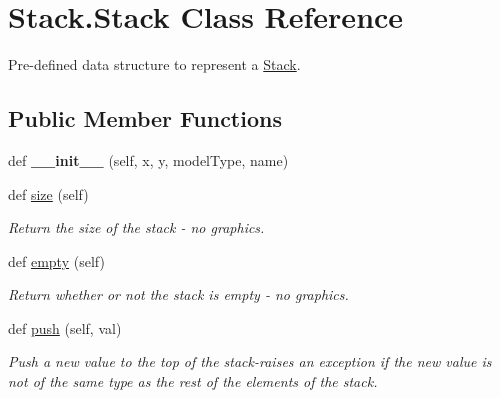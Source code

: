 \hypertarget{class_stack_1_1_stack}{}\section{Stack.\+Stack Class Reference}
\label{class_stack_1_1_stack}


Pre-\/defined data structure to represent a \hyperlink{class_stack_1_1_stack}{Stack}.  


\subsection*{Public Member Functions}
\begin{DoxyCompactItemize}
\item 
\mbox{\label{class_stack_1_1_stack_a7f70c39c7407c4939620daec869a821f}} 
def {\bfseries \+\_\+\+\_\+init\+\_\+\+\_\+} (self, x, y, model\+Type, name)
\item 
\mbox{\label{class_stack_1_1_stack_ad9471af89d6d83d7bc042b75bd6c1995}} 
def \hyperlink{class_stack_1_1_stack_ad9471af89d6d83d7bc042b75bd6c1995}{size} (self)
\begin{DoxyCompactList}\small\item\em Return the size of the stack -\/ no graphics. \end{DoxyCompactList}\item 
\mbox{\label{class_stack_1_1_stack_a9067f94dbf1a0d820abd4eb0339d6326}} 
def \hyperlink{class_stack_1_1_stack_a9067f94dbf1a0d820abd4eb0339d6326}{empty} (self)
\begin{DoxyCompactList}\small\item\em Return whether or not the stack is empty -\/ no graphics. \end{DoxyCompactList}\item 
def \hyperlink{class_stack_1_1_stack_a88abef205b55d9d26ef7958d61c4c313}{push} (self, val)
\begin{DoxyCompactList}\small\item\em Push a new value to the top of the stack-\/raises an exception if the new value is not of the same type as the rest of the elements of the stack. \end{DoxyCompactList}\item 
\mbox{\label{class_stack_1_1_stack_a5f953865bd581272431c9a1664aa43ec}} 

\end{DoxyCompactItemize}
